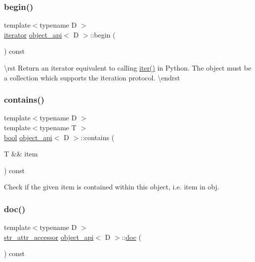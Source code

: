 \subsubsection{\texorpdfstring{begin()}{begin()}}
{\footnotesize\ttfamily template$<$typename D $>$ \\
\mbox{\hyperlink{classiterator}{iterator}} \mbox{\hyperlink{classobject__api}{object\+\_\+api}}$<$ D $>$\+::begin (\begin{DoxyParamCaption}{ }\end{DoxyParamCaption}) const}

\textbackslash{}rst Return an iterator equivalent to calling {\ttfamily \mbox{\hyperlink{group__python__builtins_ga0f2342d8d9000a3bcef531c39e97c531}{iter()}}} in Python. The object must be a collection which supports the iteration protocol. \textbackslash{}endrst \mbox{\label{classobject__api_a07869da2a7cdbcb1a8877c50b18aee83}} 
\subsubsection{\texorpdfstring{contains()}{contains()}}
{\footnotesize\ttfamily template$<$typename D $>$ \\
template$<$typename T $>$ \\
\mbox{\hyperlink{asdl_8h_af6a258d8f3ee5206d682d799316314b1}{bool}} \mbox{\hyperlink{classobject__api}{object\+\_\+api}}$<$ D $>$\+::contains (\begin{DoxyParamCaption}\item[{T \&\&}]{item }\end{DoxyParamCaption}) const}



Check if the given item is contained within this object, i.\+e. {\ttfamily item in obj}. 

\mbox{\label{classobject__api_ad1febfb66cd1ecdc3d339ad0125f6da8}} 
\subsubsection{\texorpdfstring{doc()}{doc()}}
{\footnotesize\ttfamily template$<$typename D $>$ \\
\mbox{\hyperlink{pytypes_8h_a3e386ad6d0167a1022046e78dc281efd}{str\+\_\+attr\+\_\+accessor}} \mbox{\hyperlink{classobject__api}{object\+\_\+api}}$<$ D $>$\+::\mbox{\hyperlink{structdoc}{doc}} (\begin{DoxyParamCaption}{ }\end{DoxyParamCaption}) const}



